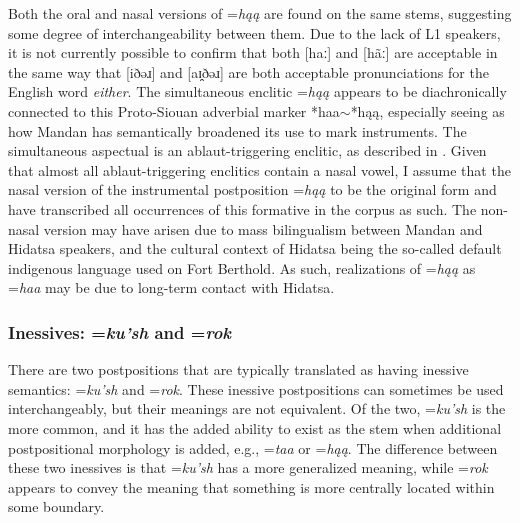 Both the oral and nasal versions of =\textit{hąą} are found on the same stems, suggesting some degree of interchangeability between them. Due to the lack of L1 speakers, it is not currently possible to confirm that both [haː] and [hãː] are acceptable in the same way that [iðəɹ] and [aɪ̯ðəɹ] are both acceptable pronunciations for the English word \textit{either}. The simultaneous enclitic =\textit{hąą} appears to be diachronically connected to this Proto-Siouan adverbial marker *haa$\sim$*hąą, especially seeing as how Mandan has semantically broadened its use to mark instruments. The simultaneous aspectual is an ablaut-triggering enclitic, as described in . Given that almost all ablaut-triggering enclitics contain a nasal vowel, I assume that the nasal version of the instrumental postposition =\textit{hąą} to be the original form and have transcribed all occurrences of this formative in the corpus as such. The non-nasal version may have arisen due to mass bilingualism between Mandan and Hidatsa speakers, and the cultural context of Hidatsa being the so-called default indigenous language used on Fort Berthold. As such, realizations of =\textit{hąą} as =\textit{haa} may be due to long-term contact with Hidatsa.

\subsubsection{Inessives: =\textit{ku'sh} and =\textit{rok}}

There are two postpositions that are typically translated as having inessive semantics: =\textit{ku'sh} and =\textit{rok}. These inessive postpositions can sometimes be used interchangeably, but their meanings are not equivalent. Of the two, =\textit{ku'sh} is the more common, and it has the added ability to exist as the stem when additional postpositional morphology is added, e.g., =\textit{taa} or =\textit{hąą}. The difference between these two inessives is that =\textit{ku'sh} has a more generalized meaning, while =\textit{rok} appears to convey the meaning that something is more centrally located within some boundary. 


